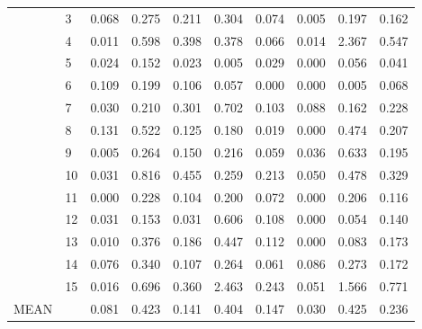 \begin{table}
\begin{tabular}{llrrrrrrrr}
 & 3 & 0.068 & 0.275 & 0.211 & 0.304 & 0.074 & 0.005 & 0.197 & 0.162 \\
 & 4 & 0.011 & 0.598 & 0.398 & 0.378 & 0.066 & 0.014 & 2.367 & 0.547 \\
 & 5 & 0.024 & 0.152 & 0.023 & 0.005 & 0.029 & 0.000 & 0.056 & 0.041 \\
 & 6 & 0.109 & 0.199 & 0.106 & 0.057 & 0.000 & 0.000 & 0.005 & 0.068 \\
 & 7 & 0.030 & 0.210 & 0.301 & 0.702 & 0.103 & 0.088 & 0.162 & 0.228 \\
 & 8 & 0.131 & 0.522 & 0.125 & 0.180 & 0.019 & 0.000 & 0.474 & 0.207 \\
 & 9 & 0.005 & 0.264 & 0.150 & 0.216 & 0.059 & 0.036 & 0.633 & 0.195 \\
 & 10 & 0.031 & 0.816 & 0.455 & 0.259 & 0.213 & 0.050 & 0.478 & 0.329 \\
 & 11 & 0.000 & 0.228 & 0.104 & 0.200 & 0.072 & 0.000 & 0.206 & 0.116 \\
 & 12 & 0.031 & 0.153 & 0.031 & 0.606 & 0.108 & 0.000 & 0.054 & 0.140 \\
 & 13 & 0.010 & 0.376 & 0.186 & 0.447 & 0.112 & 0.000 & 0.083 & 0.173 \\
 & 14 & 0.076 & 0.340 & 0.107 & 0.264 & 0.061 & 0.086 & 0.273 & 0.172 \\
 & 15 & 0.016 & 0.696 & 0.360 & 2.463 & 0.243 & 0.051 & 1.566 & 0.771 \\
\cline{1-10}
MEAN &  & 0.081 & 0.423 & 0.141 & 0.404 & 0.147 & 0.030 & 0.425 & 0.236 \\
\cline{1-10}
\bottomrule
\end{tabular}
\end{table}
